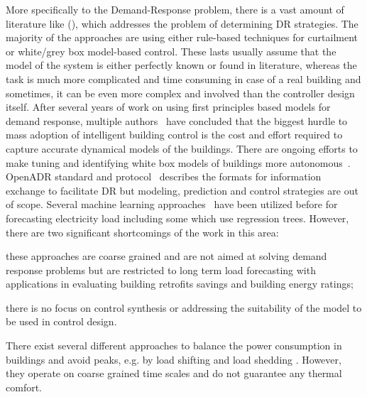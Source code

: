 \textcolor[rgb]{1.00,0.00,0.00}{More specifically to the Demand-Response problem, there is a vast amount of literature like (\cite{oldewurtel2013towards,xu2004peak}), which addresses the problem of determining DR strategies. The majority of the approaches are using either rule-based techniques for curtailment or white/grey box model-based control. These lasts usually assume that the model of the system is either perfectly known or found in literature, whereas the task is much more complicated and time consuming in case of a real building and sometimes, it can be even more complex and involved than the controller design itself. After several years of work on using first principles based models for demand response, multiple authors~\cite{costmpc,reallife} have concluded that the biggest hurdle to mass adoption of intelligent building control is the cost and effort required to capture accurate dynamical models of the buildings. There are ongoing efforts to make tuning and identifying white box models of buildings more autonomous~\cite{new2012autotune}. OpenADR standard and protocol~\cite{openadr} describes the formats for information exchange to facilitate DR but modeling, prediction and control strategies are out of scope. Several machine learning approaches~\cite{edwards2012predicting,vaghefi2014modeling,yin2012scalable} have been utilized before for forecasting electricity load including some which use regression trees. However, there are two significant shortcomings of the work in this area: 
	\begin{inparaenum}[(a)]
		\item these approaches are coarse grained and  are not aimed at solving demand response problems but are restricted to long term load forecasting with applications in evaluating building retrofits savings and building energy ratings; 
		\item  there is no focus on control synthesis or addressing the suitability of the model to be used in control design. 
	\end{inparaenum}
	There exist several different approaches to balance the power consumption in buildings and avoid peaks, e.g. by load shifting and load shedding \cite{KiliccoteEtAl06aca,LeeEtAl08dom}. However, they operate on coarse grained time scales and do not guarantee any thermal comfort.}
\newpage
